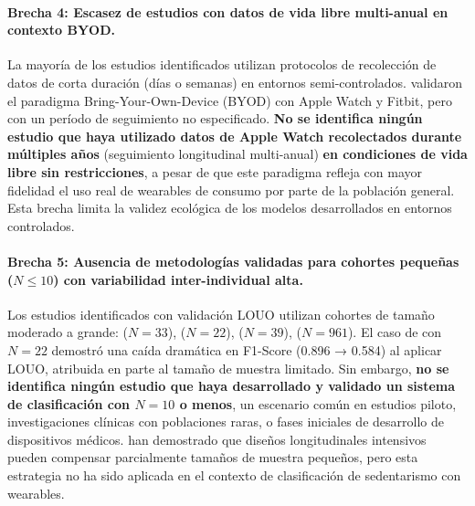 
\paragraph{Brecha 4: Escasez de estudios con datos de vida libre multi-anual en contexto BYOD.}

La mayoría de los estudios identificados utilizan protocolos de recolección de datos de corta duración (días o semanas) en entornos semi-controlados. \cite{Fuller2021Predicting} validaron el paradigma Bring-Your-Own-Device (BYOD) con Apple Watch y Fitbit, pero con un período de seguimiento no especificado. \textbf{No se identifica ningún estudio que haya utilizado datos de Apple Watch recolectados durante múltiples años} (seguimiento longitudinal multi-anual) \textbf{en condiciones de vida libre sin restricciones}, a pesar de que este paradigma refleja con mayor fidelidad el uso real de wearables de consumo por parte de la población general. Esta brecha limita la validez ecológica de los modelos desarrollados en entornos controlados.


\paragraph{Brecha 5: Ausencia de metodologías validadas para cohortes pequeñas ($N \leq 10$) con variabilidad inter-individual alta.}

Los estudios identificados con validación LOUO utilizan cohortes de tamaño moderado a grande: \cite{Fuller2021Predicting} ($N=33$), \cite{Mathew2024LOSO} ($N=22$), \cite{OGrady2024AppleWatch} ($N=39$), \cite{Marino2024ARIC} ($N=961$). El caso de \cite{Mathew2024LOSO} con $N=22$ demostró una caída dramática en F1-Score (0.896 → 0.584) al aplicar LOUO, atribuida en parte al tamaño de muestra limitado. Sin embargo, \textbf{no se identifica ningún estudio que haya desarrollado y validado un sistema de clasificación con $N=10$ o menos}, un escenario común en estudios piloto, investigaciones clínicas con poblaciones raras, o fases iniciales de desarrollo de dispositivos médicos. \cite{Bolger2013} han demostrado que diseños longitudinales intensivos pueden compensar parcialmente tamaños de muestra pequeños, pero esta estrategia no ha sido aplicada en el contexto de clasificación de sedentarismo con wearables.


